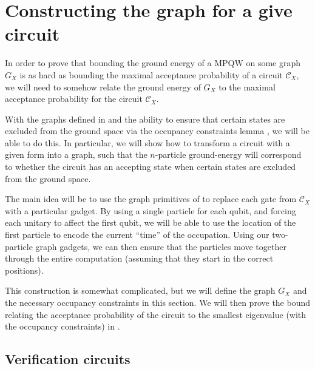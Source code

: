 \documentclass[../thesis-main/thesis-main]{subfiles}
\begin{document}
\section{Constructing the graph for a give circuit}\label{sec:graph_construction}

In order to prove that bounding the ground energy of a MPQW on some graph $G_X$ is as hard as bounding the maximal acceptance probability of a circuit $\mathcal{C}_X$, we will need to somehow relate the ground energy of $G_X$ to the maximal acceptance probability for the circuit $\mathcal{C}_X$.  

With the graphs defined in  and the ability to ensure that certain states are excluded from the ground space via the occupancy constraints lemma , we will be able to do this.   In particular, we will show how to transform a circuit with a given form into a graph, such that the $n$-particle ground-energy will correspond to whether the circuit has an accepting state when certain states are excluded from the ground space.  

The main idea will be to use the graph primitives of  to replace each gate from $\mathcal{C}_X$ with a particular gadget. By using a single particle for each qubit, and forcing each unitary to affect the first qubit, we will be able to use the location of the first particle to encode the current ``time'' of the occupation.  Using our two-particle graph gadgets, we can then ensure that the particles move together through the entire computation (assuming that they start in the correct positions).  

This construction is somewhat complicated, but we will define the graph $G_X$ and the necessary occupancy constraints in this section.  We will then prove the bound relating the acceptance probability of the circuit to the smallest eigenvalue (with the occupancy constraints) in .

\subsection{Verification circuits} \label{sec:verification_circuit}
\end{document}
